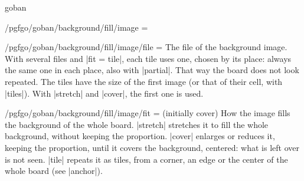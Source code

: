 \begin{environment}{{goban}}
\begin{key}{/pgfgo/goban/background/fill/image =}
		\begin{codeexample}[]
			\begin{goban}[9,
				background = {fill = {image = {file = pgfgo-board.jpg}}}]
			\end{goban}

			\begin{goban}[9, partial = A1:E5,
				background = {fill = {image = {file = pgfgo-board.jpg}},
					rounded corners = 6pt}]
			\end{goban}
		\end{codeexample}
	\end{key}

	\begin{key}{/pgfgo/goban/background/fill/image/file =}
		The file of the background image. With several files and |fit = tile|, each tile uses one, chosen by its place: always the same one in each place, also with |partial|. That way the board does not look repeated. The tiles have the size of the first image (or that of their cell, with |tiles|). With |stretch| and |cover|, the first one is used.

		\begin{codeexample}[]
			\begin{goban}[9, background = {fill = {image = {
				file = {pgfgo-tile.png, pgfgo-cell.png, pgfgo-board.jpg},
				fit = tile, width = 1cm}}}]
			\end{goban}
		\end{codeexample}
	\end{key}

	\begin{key}{/pgfgo/goban/background/fill/image/fit = (initially cover)}
		How the image fills the background of the whole board. |stretch| stretches it to fill the whole background, without keeping the proportion. |cover| enlarges or reduces it, keeping the proportion, until it covers the background, centered: what is left over is not seen. |tile| repeats it as tiles, from a corner, an edge or the center of the whole board (see |anchor|).

		\begin{codeexample}[]
			\begin{goban}[9, background = {fill = {image = {
				file = pgfgo-tile.png, fit = tile, width = 1cm}}}]
			\end{goban}

			\begin{goban}[9, partial = D4:H8, background = {fill = {image = {
				file = pgfgo-tile.png, fit = tile, width = 1cm}}}]
			\end{goban}
		\end{codeexample}
	\end{key}


\end{environment}
